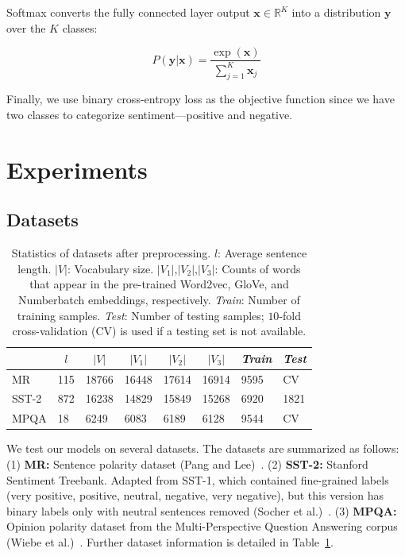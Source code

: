 \documentclass{article}
\begin{document}
Softmax converts the fully connected layer output $\mathbf{x} \in \mathbb{R}^K$ into a distribution $\mathbf{y}$ over the $K$ classes:

\begin{equation}
    P(\mathbf{y}|\mathbf{x}) = \frac{\exp (\mathbf{x})}{\sum_{j=1}^K \mathbf{x}_j}
\end{equation}

Finally, we use binary cross-entropy loss as the objective function since we have two classes to categorize sentiment---positive and negative.

\section{Experiments}

\subsection{Datasets}

\begin{table}
    \caption{Statistics of datasets after preprocessing. $l$: Average sentence length. $|V|$: Vocabulary size. $|V_1|$,$|V_2|$,$|V_3|$: Counts of words that appear in the pre-trained Word2vec, GloVe, and Numberbatch embeddings, respectively. \textit{Train}: Number of training samples. \textit{Test}: Number of testing samples; $10$-fold cross-validation (CV) is used if a testing set is not available.}
    \label{datasets-table}
    \centering
    \begin{tabular}{llllllll}
        \toprule
        & \multicolumn{1}{c}{$l$} & \multicolumn{1}{c}{$|V|$} & \multicolumn{1}{c}{$|V_1|$} & \multicolumn{1}{c}{$|V_2|$} & \multicolumn{1}{c}{$|V_3|$} & \multicolumn{1}{c}{\textit{Train}} & \multicolumn{1}{c}{\textit{Test}} \\
        \midrule
        MR & 115 & 18766 & 16448 & 17614 & 16914 & 9595 & CV \\
        SST-2 & 872 & 16238 & 14829 & 15849 & 15268 & 6920 & 1821 \\
        MPQA & 18 & 6249 & 6083 & 6189 & 6128 & 9544 & CV \\
        \bottomrule
    \end{tabular}
\end{table}

We test our models on several datasets. The datasets are summarized as follows: (1) \textbf{MR:} Sentence polarity dataset (Pang and Lee)~\cite{panglee}. (2) \textbf{SST-2:} Stanford Sentiment Treebank. Adapted from SST-1, which contained fine-grained labels (very positive, positive, neutral, negative, very negative), but this version has binary labels only with neutral sentences removed (Socher et al.)~\cite{socher}. (3) \textbf{MPQA:} Opinion polarity dataset from the Multi-Perspective Question Answering corpus (Wiebe et al.)~\cite{wiebe}. Further dataset information is detailed in Table~\ref{datasets-table}.
\end{document}
